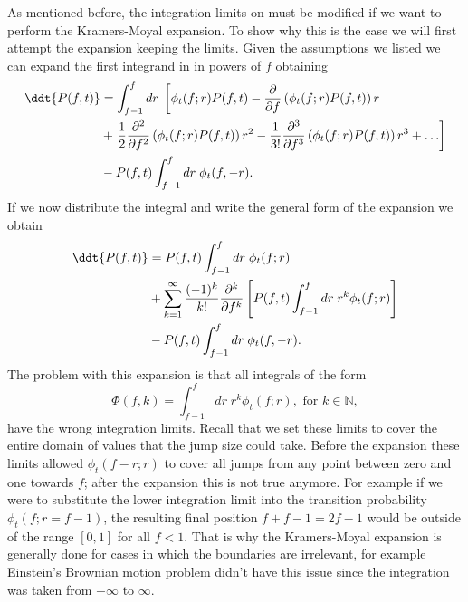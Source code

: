 As mentioned before, the integration limits on  must be
modified if we want to perform the Kramers-Moyal expansion. To show why this is
the case we will first attempt the expansion keeping the limits. Given the
assumptions we listed we can expand the first integrand in
 in powers of $f$ obtaining
\begin{equation}
  \begin{split}
    \ddt{P(f, t)} &= \int^f_{f - 1} dr \;
    \left[
    \phi_t(f; r) P(f, t) -
    {\partial \over \partial f} \left( \phi_t(f; r) P(f, t) \right) r \right. \\
    &+ \left.
    {1 \over 2} {\partial^2 \over \partial f^2}
    \left( \phi_t(f; r) P(f, t) \right) r^2 -
    {1 \over 3!} {\partial^3 \over \partial f^3}
    \left( \phi_t(f; r) P(f, t) \right) r^3 + \ldots
    \right] \\
    &-
    P(f, t) \int_{f - 1}^f dr \; \phi_t(f, -r).
  \end{split}
\end{equation}
If we now distribute the integral and write the general form of the expansion
we obtain
\begin{equation}
  \begin{split}
    \ddt{P(f, t)} &= P(f, t)\int^f_{f - 1} dr \; \phi_t(f; r) \\
    &+
    \sum_{k=1}^\infty {(-1)^k \over k!} {\partial^k \over \partial f^k}
    \left[
    P(f, t) \int_{f-1}^f dr \; r^k \phi_t(f; r)
    \right] \\
    &-
    P(f, t) \int_{f - 1}^f dr \; \phi_t(f, -r).
  \end{split}
\end{equation}
The problem with this expansion is that all integrals of the form
\begin{equation}
  \Phi(f, k) = \int_{f-1}^f dr \; r^k \phi_t(f; r),
  \text{ for } k \in \mathbb{N},
\end{equation}
have the wrong integration limits. Recall that we set these limits to cover the
entire domain of values that the jump size could take. Before the expansion
these limits allowed $\phi_t(f - r; r)$ to cover all jumps from any point
between zero and one towards $f$; after the expansion this is not true anymore.
For example if we were to substitute the lower integration limit into the
transition probability $\phi_t(f; r = f-1)$, the resulting final position $f + f
-1 = 2f -1$ would be outside of the range $[0, 1]$ for all $f < 1$. That is why
the Kramers-Moyal expansion is generally done for cases in which the boundaries
are irrelevant, for example Einstein's Brownian motion problem didn't have this
issue since the integration was taken from $-\infty$ to $\infty$.

